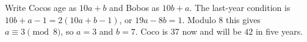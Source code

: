 Write Coco\textquotesingle s age as $10a+b$ and Bobo\textquotesingle s as $10b+a$. The last-year condition is $10b+a-1=2(10a+b-1)$, or $19a-8b=1$. Modulo 8 this gives $a\equiv3\pmod8$, so $a=3$ and $b=7$. Coco is 37 now and will be $\boxed{42}$ in five years.
